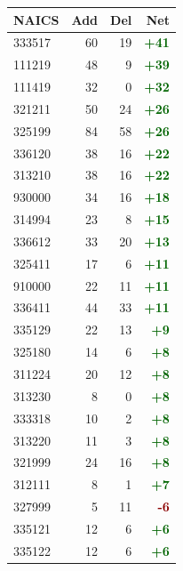 \documentclass[11pt]{article}
\begin{document}
\begin{table}[H]
\centering
\begin{minipage}{0.48\textwidth}
\centering
{}
\begin{tabular}{lrrr}
\toprule
\textbf{NAICS} & \textbf{Add} & \textbf{Del} & \textbf{Net} \\
\midrule
333517 & 60 & 19 & \textcolor{darkgreen}{\textbf{+41}} \\
111219 & 48 & 9 & \textcolor{darkgreen}{\textbf{+39}} \\
111419 & 32 & 0 & \textcolor{darkgreen}{\textbf{+32}} \\
321211 & 50 & 24 & \textcolor{darkgreen}{\textbf{+26}} \\
325199 & 84 & 58 & \textcolor{darkgreen}{\textbf{+26}} \\
336120 & 38 & 16 & \textcolor{darkgreen}{\textbf{+22}} \\
313210 & 38 & 16 & \textcolor{darkgreen}{\textbf{+22}} \\
930000 & 34 & 16 & \textcolor{darkgreen}{\textbf{+18}} \\
314994 & 23 & 8 & \textcolor{darkgreen}{\textbf{+15}} \\
336612 & 33 & 20 & \textcolor{darkgreen}{\textbf{+13}} \\
325411 & 17 & 6 & \textcolor{darkgreen}{\textbf{+11}} \\
910000 & 22 & 11 & \textcolor{darkgreen}{\textbf{+11}} \\
336411 & 44 & 33 & \textcolor{darkgreen}{\textbf{+11}} \\
335129 & 22 & 13 & \textcolor{darkgreen}{\textbf{+9}} \\
325180 & 14 & 6 & \textcolor{darkgreen}{\textbf{+8}} \\
311224 & 20 & 12 & \textcolor{darkgreen}{\textbf{+8}} \\
313230 & 8 & 0 & \textcolor{darkgreen}{\textbf{+8}} \\
333318 & 10 & 2 & \textcolor{darkgreen}{\textbf{+8}} \\
313220 & 11 & 3 & \textcolor{darkgreen}{\textbf{+8}} \\
321999 & 24 & 16 & \textcolor{darkgreen}{\textbf{+8}} \\
312111 & 8 & 1 & \textcolor{darkgreen}{\textbf{+7}} \\
327999 & 5 & 11 & \textcolor{darkred}{\textbf{-6}} \\
335121 & 12 & 6 & \textcolor{darkgreen}{\textbf{+6}} \\
335122 & 12 & 6 & \textcolor{darkgreen}{\textbf{+6}} \\

\end{tabular}
\end{minipage}
\end{table}
\end{document}
